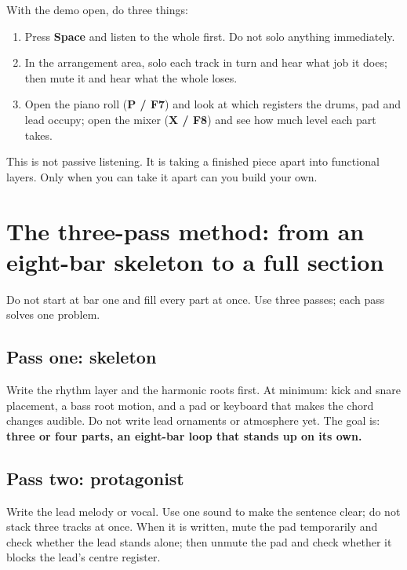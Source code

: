 With the demo open, do three things:

\begin{enumerate}
\item Press \textbf{Space} and listen to the whole first. Do not solo anything immediately.
\item In the arrangement area, solo each track in turn and hear what job it does; then mute it and hear what the whole loses.
\item Open the piano roll (\textbf{P / F7}) and look at which registers the drums, pad and lead occupy; open the mixer (\textbf{X / F8}) and see how much level each part takes.
\end{enumerate}

This is not passive listening. It is taking a finished piece apart into functional layers. Only when you can take it apart can you build your own.


\section{The three-pass method: from an eight-bar skeleton to a full section}
\label{sec:three-pass}

Do not start at bar one and fill every part at once. Use three passes; each pass solves one problem.

\subsection*{Pass one: skeleton}
Write the rhythm layer and the harmonic roots first. At minimum: kick and snare placement, a bass root motion, and a pad or keyboard that makes the chord changes audible. Do not write lead ornaments or atmosphere yet. The goal is: \textbf{three or four parts, an eight-bar loop that stands up on its own.}

\subsection*{Pass two: protagonist}
Write the lead melody or vocal. Use one sound to make the sentence clear; do not stack three tracks at once. When it is written, mute the pad temporarily and check whether the lead stands alone; then unmute the pad and check whether it blocks the lead's centre register.

